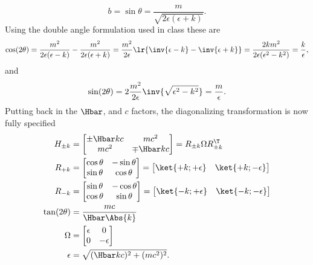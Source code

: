 %
\begin{equation}\label{eqn:gradQuantumProblemSet4Problem3:460}
b = \sin\theta
=
\frac{m}{\sqrt{2\epsilon(\epsilon + k)}}.
\end{equation}
%
Using the double angle formulation used in class these are
%
\begin{dmath}\label{eqn:gradQuantumProblemSet4Problem3:480}
\cos(2 \theta)
=
\frac{m^2}{2\epsilon(\epsilon - k)} -
\frac{m^2}{2\epsilon(\epsilon + k)}
=
\frac{m^2}{2 \epsilon} \lr{ \inv{\epsilon - k} - \inv{\epsilon + k} }
=
\frac{2 k m^2}{2 \epsilon (\epsilon^2 - k^2)}
=
\frac{k}{\epsilon},
\end{dmath}
%
and
\begin{dmath}\label{eqn:gradQuantumProblemSet4Problem3:500}
\sin(2 \theta)
=
2 \frac{m^2}{2 \epsilon} \inv{\sqrt{\epsilon^2 - k^2}}
=
\frac{m}{\epsilon}.
\end{dmath}
%
Putting back in the \( \Hbar \), and \( c\) factors, the diagonalizing transformation is now fully specified
%
\begin{equation}\label{eqn:gradQuantumProblemSet4Problem3:520}
\begin{aligned}
H_{\pm k} &=
\begin{bmatrix}
\pm \Hbar k c & m c^2 \\
m c^2 & \mp \Hbar k c
\end{bmatrix}
=
R_{\pm k} \Omega R_{\pm k}^\T \\
R_{+ k} &=
\begin{bmatrix}
\cos\theta & -\sin\theta  \\
\sin\theta & \cos\theta
\end{bmatrix}
=
\begin{bmatrix}
\ket{+k;+\epsilon} &
\ket{+k;-\epsilon}
\end{bmatrix}
\\
R_{- k} &=
\begin{bmatrix}
\sin\theta & -\cos\theta  \\
\cos\theta & \sin\theta
\end{bmatrix}
=
\begin{bmatrix}
\ket{-k;+\epsilon} &
\ket{-k;-\epsilon}
\end{bmatrix}
\\
\tan(2 \theta) &= \frac{m c}{\Hbar \Abs{k}} \\
\Omega &=
\begin{bmatrix}
\epsilon & 0 \\
0 & -\epsilon
\end{bmatrix} \\
\epsilon &= \sqrt{(\Hbar k c)^2 + (m c^2)^2}.
\end{aligned}
\end{equation}
